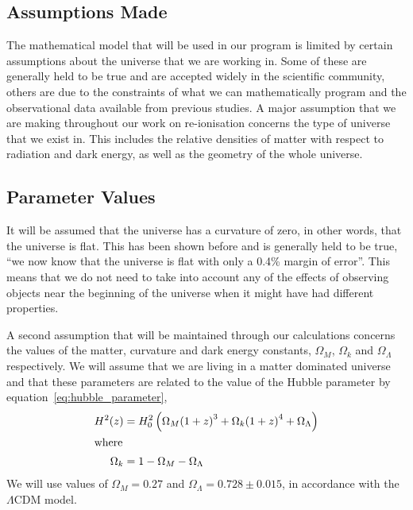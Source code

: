 
\subsection{Assumptions Made} %
\label{sub:assumptions_made}
    The mathematical model that will be used in our program is limited by certain assumptions about the universe that we are working in. Some of these are generally held to be true and are accepted widely in the scientific community, others are due to the constraints of what we can mathematically program and the observational data available from previous studies. A major assumption that we are making throughout our work on re-ionisation concerns the type of universe that we exist in. This includes the relative densities of matter with respect to radiation and dark energy, as well as the geometry of the whole universe. 


\subsection{Parameter Values} %
\label{sub:parameter_values}

    It will be assumed that the universe has a curvature of zero, in other words, that the universe is flat. This has been shown before and is generally held to be true, ``we now know that the universe is flat with only a 0.4\% margin of error''\cite{nasa_uni_shape}. This means that we do not need to take into account any of the effects of observing objects near the beginning of the universe when it might have had different properties.

    A second assumption that will be maintained through our calculations concerns the values of the matter, curvature and dark energy constants, $\Omega_M$, $\Omega_k$ and $\Omega_{\Lambda}$ respectively. We will assume that we are living in a matter dominated universe and that these parameters are related to the value of the Hubble parameter by equation~\ref{eq:hubble_parameter}\cite{hubble_parameter_astro_journal},
    \begin{align}
        H^2(z) &= H_0^2\left( \Omega_M {(1+z)}^3 + \Omega_k {(1+z)}^4 + \Omega_{\Lambda} \right) \label{eq:hubble_parameter}\\
        \intertext{where}
        \Omega_k &= 1- \Omega_M - \Omega_{\Lambda}
    \end{align}
    We will use values of $\Omega_M=0.27$ and $\Omega_{\Lambda}=0.728\pm0.015$, in accordance with the $\Lambda$CDM model\cite{WMAP_Observations_Cosmological_Interpretation}.


